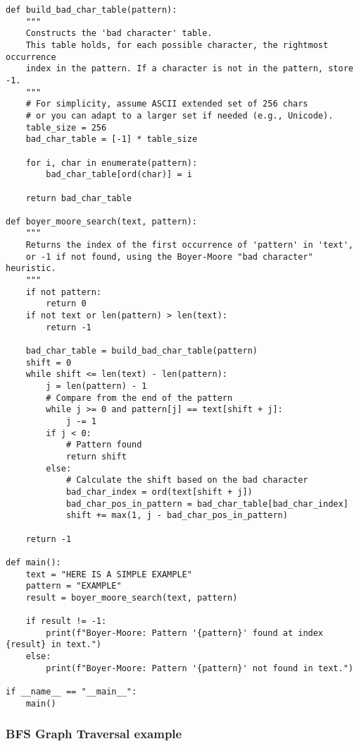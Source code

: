 \documentclass[a4paper,12pt]{article}
\begin{document}
\begin{lstlisting}[style=pythonstyle]
def build_bad_char_table(pattern):
    """
    Constructs the 'bad character' table.
    This table holds, for each possible character, the rightmost occurrence
    index in the pattern. If a character is not in the pattern, store -1.
    """
    # For simplicity, assume ASCII extended set of 256 chars
    # or you can adapt to a larger set if needed (e.g., Unicode).
    table_size = 256  
    bad_char_table = [-1] * table_size

    for i, char in enumerate(pattern):
        bad_char_table[ord(char)] = i

    return bad_char_table

def boyer_moore_search(text, pattern):
    """
    Returns the index of the first occurrence of 'pattern' in 'text',
    or -1 if not found, using the Boyer-Moore "bad character" heuristic.
    """
    if not pattern:
        return 0
    if not text or len(pattern) > len(text):
        return -1

    bad_char_table = build_bad_char_table(pattern)
    shift = 0
    while shift <= len(text) - len(pattern):
        j = len(pattern) - 1
        # Compare from the end of the pattern
        while j >= 0 and pattern[j] == text[shift + j]:
            j -= 1
        if j < 0:
            # Pattern found
            return shift
        else:
            # Calculate the shift based on the bad character
            bad_char_index = ord(text[shift + j])
            bad_char_pos_in_pattern = bad_char_table[bad_char_index]
            shift += max(1, j - bad_char_pos_in_pattern)

    return -1

def main():
    text = "HERE IS A SIMPLE EXAMPLE"
    pattern = "EXAMPLE"
    result = boyer_moore_search(text, pattern)

    if result != -1:
        print(f"Boyer-Moore: Pattern '{pattern}' found at index {result} in text.")
    else:
        print(f"Boyer-Moore: Pattern '{pattern}' not found in text.")

if __name__ == "__main__":
    main()

\end{lstlisting}

\subsubsection{BFS Graph Traversal example}
\end{document}

